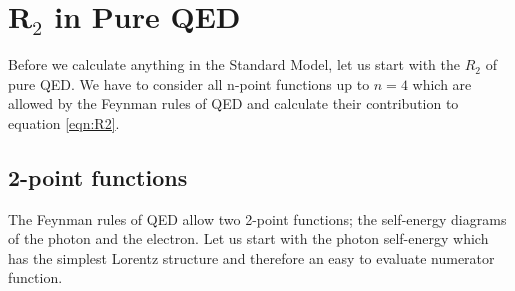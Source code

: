\section{R$_2$ in Pure QED}
\label{sec:pureQED} 
Before we calculate anything in the Standard Model, let us start with the $R_2$ of pure QED. We have to consider all n-point functions up to $n=4$ which are allowed by the Feynman rules of QED and calculate their contribution to equation \ref{eqn:R2}.
\subsection{2-point functions}
The Feynman rules of QED allow two 2-point functions; the self-energy diagrams of the photon and the electron. Let us start with the photon self-energy which has the simplest Lorentz structure and therefore an easy to evaluate numerator function. \\

